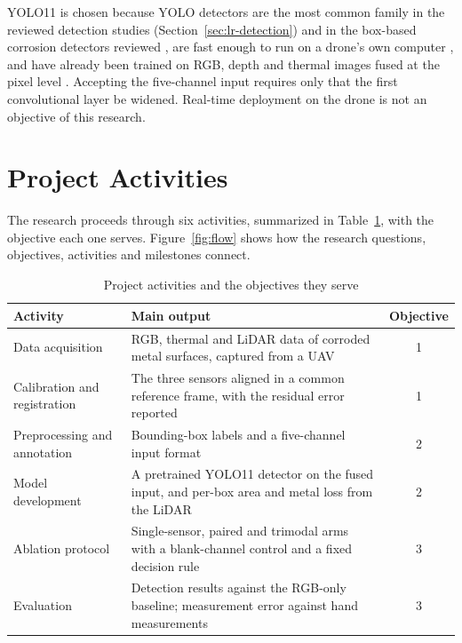 YOLO11 is chosen because YOLO detectors are the most common family in the
reviewed detection studies (Section~\ref{sec:lr-detection}) and in the
box-based corrosion detectors reviewed \citep{Mao2026,Fu2024,Bui2026,Li2024b,Yu2023},
are fast enough to run on a drone's own computer \citep{Yu2023}, and have already
been trained on RGB, depth and thermal images fused at the pixel level
\citep{Cao2026}. Accepting the five-channel input
requires only that the first convolutional layer be widened. Real-time
deployment on the drone is not an objective of this research.

\section{Project Activities}
\label{sec:project-activities}

The research proceeds through six activities, summarized in
Table~\ref{tab:activities}, with the objective each one serves.
Figure~\ref{fig:flow} shows how the research questions, objectives, activities
and milestones connect.

\begin{table}[htbp]
\centering
\caption{Project activities and the objectives they serve}
\label{tab:activities}
\small
\renewcommand{\arraystretch}{1.2}
\begin{tabularx}{\textwidth}{@{}>{\RaggedRight\arraybackslash}p{3.6cm}>{\RaggedRight\arraybackslash}Xc@{}}
\toprule
\textbf{Activity} & \textbf{Main output} & \textbf{Objective} \\
\midrule
Data acquisition & RGB, thermal and LiDAR data of corroded metal surfaces, captured from a UAV & 1 \\
Calibration and registration & The three sensors aligned in a common reference frame, with the residual error reported & 1 \\
Preprocessing and annotation & Bounding-box labels and a five-channel input format & 2 \\
Model development & A pretrained YOLO11 detector on the fused input, and per-box area and metal loss from the LiDAR & 2 \\
Ablation protocol & Single-sensor, paired and trimodal arms with a blank-channel control and a fixed decision rule & 3 \\
Evaluation & Detection results against the RGB-only baseline; measurement error against hand measurements & 3 \\
\bottomrule
\end{tabularx}
\end{table}

